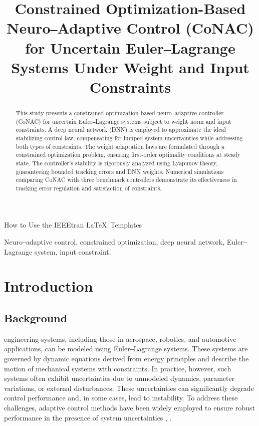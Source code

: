 \documentclass[lettersize,journal]{IEEEtran}
\begin{document}
\title{
Constrained Optimization-Based Neuro‒Adaptive Control (CoNAC) for Uncertain Euler‒Lagrange Systems Under Weight and Input Constraints 
}

%
{How to Use the IEEEtran \LaTeX \ Templates}

\maketitle

\begin{abstract}
    This study presents a constrained optimization-based neuro‒adaptive controller (CoNAC) for uncertain Euler‒Lagrange systems subject to weight norm and input constraints. A deep neural network (DNN) is employed to approximate the ideal stabilizing control law, compensating for lumped system uncertainties while addressing both types of constraints. The weight adaptation laws are formulated through a constrained optimization problem, ensuring first-order optimality conditions at steady state. The controller's stability is rigorously analyzed using Lyapunov theory, guaranteeing bounded tracking errors and DNN weights. Numerical simulations comparing CoNAC with three benchmark controllers demonstrate its effectiveness in tracking error regulation and satisfaction of constraints.
\end{abstract}

\begin{IEEEkeywords}
Neuro‒adaptive control, constrained optimization, deep neural network, Euler‒Lagrange system, input constraint.
\end{IEEEkeywords}

\section{Introduction}

\subsection{Background}

 engineering systems, including those in aerospace, robotics, and automotive applications, can be modeled using Euler‒Lagrange systems. These systems are governed by dynamic equations derived from energy principles and describe the motion of mechanical systems with constraints. In practice, however, such systems often exhibit uncertainties due to unmodeled dynamics, parameter variations, or external disturbances. These uncertainties can significantly degrade control performance and, in some cases, lead to instability. To address these challenges, adaptive control methods have been widely employed to ensure robust performance in the presence of system uncertainties \cite{RN4}, \cite{RN2}.
\end{document}
